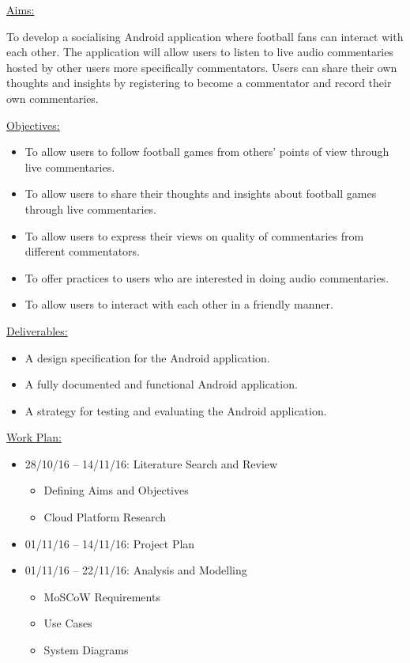 \documentclass{article}
\begin{document}
\newpage
\begin{flushleft}
{\Large \underline{Aims:}}\par
To develop a socialising Android application where football fans can interact with each other. The application will allow users to listen to live audio commentaries hosted by other users more specifically commentators. Users can share their own thoughts and insights by registering to become a commentator and record their own commentaries.\par
{\Large \underline{Objectives:}}
\begin{itemize}
	\item To allow users to follow football games from others’ points of view through live commentaries.
	\item To allow users to share their thoughts and insights about football games through live commentaries.
	\item To allow users to express their views on quality of commentaries from different commentators.
	\item To offer practices to users who are interested in doing audio commentaries.
	\item To allow users to interact with each other in a friendly manner.
\end{itemize}
{\Large \underline{Deliverables:}}
\begin{itemize}
	\item A design specification for the Android application.
	\item A fully documented and functional Android application.
	\item A strategy for testing and evaluating the Android application.
\end{itemize}
{\Large \underline{Work Plan:}}
\begin{itemize}
	\item 28/10/16 – 14/11/16: Literature Search and Review
	\begin{itemize}
		\item Defining Aims and Objectives 
		\item Cloud Platform Research 
	\end{itemize}
	\item 01/11/16 – 14/11/16: Project Plan
	\item 01/11/16 – 22/11/16: Analysis and Modelling
	\begin{itemize}
		\item MoSCoW Requirements 
		\item Use Cases 
		\item System Diagrams

\end{itemize}
\end{itemize}
\end{flushleft}
\end{document}
